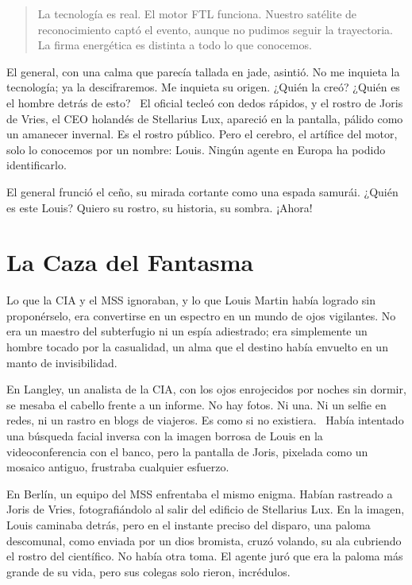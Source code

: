 \begin{quote}
\calli
\glqq La tecnología es real. El motor FTL funciona. Nuestro satélite de reconocimiento captó el evento, aunque no pudimos seguir la trayectoria. La firma energética es distinta a todo lo que conocemos.\grqq
\end{quote}

El general, con una calma que parecía tallada en jade, asintió. \glqq No me inquieta la tecnología; ya la descifraremos. Me inquieta su origen. ¿Quién la creó? ¿Quién es el hombre detrás de esto?\grqq~ El oficial tecleó con dedos rápidos, y el rostro de Joris de Vries, el CEO holandés de Stellarius Lux, apareció en la pantalla, pálido como un amanecer invernal. \glqq Es el rostro público. Pero el cerebro, el artífice del motor, solo lo conocemos por un nombre: Louis. Ningún agente en Europa ha podido identificarlo.\grqq

El general frunció el ceño, su mirada cortante como una espada samurái. \glqq ¿Quién es este Louis? Quiero su rostro, su historia, su sombra. ¡Ahora!\grqq

\section{La Caza del Fantasma}

Lo que la CIA y el MSS ignoraban, y lo que Louis Martin había logrado sin proponérselo, era convertirse en un espectro en un mundo de ojos vigilantes. No era un maestro del subterfugio ni un espía adiestrado; era simplemente un hombre tocado por la casualidad, un alma que el destino había envuelto en un manto de invisibilidad.

En Langley, un analista de la CIA, con los ojos enrojecidos por noches sin dormir, se mesaba el cabello frente a un informe. \glqq No hay fotos. Ni una. Ni un selfie en redes, ni un rastro en blogs de viajeros. Es como si no existiera.\grqq~ Había intentado una búsqueda facial inversa con la imagen borrosa de Louis en la videoconferencia con el banco, pero la pantalla de Joris, pixelada como un mosaico antiguo, frustraba cualquier esfuerzo.

En Berlín, un equipo del MSS enfrentaba el mismo enigma. Habían rastreado a Joris de Vries, fotografiándolo al salir del edificio de Stellarius Lux. En la imagen, Louis caminaba detrás, pero en el instante preciso del disparo, una paloma descomunal, como enviada por un dios bromista, cruzó volando, su ala cubriendo el rostro del científico. No había otra toma. El agente juró que era la paloma más grande de su vida, pero sus colegas solo rieron, incrédulos.

